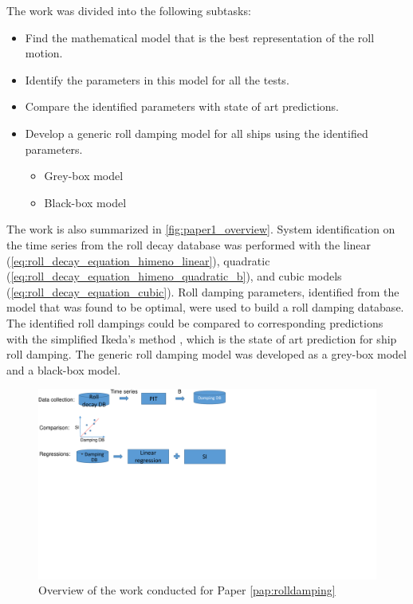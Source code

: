 \noindent The work was divided into the following subtasks: 
\begin{itemize}
    \item Find the mathematical model that is the best representation of the roll motion.
    \item Identify the parameters in this model for all the tests.
    \item Compare the identified parameters with state of art predictions.
    \item Develop a generic roll damping model for all ships using the identified parameters.
    \begin{itemize}
        \item Grey-box model
        \item Black-box model
    \end{itemize}
\end{itemize}

\noindent The work is also summarized in \autoref{fig:paper1_overview}. System identification on the time series from the roll decay database was performed with the linear (\autoref{eq:roll_decay_equation_himeno_linear}), quadratic (\autoref{eq:roll_decay_equation_himeno_quadratic_b}), and cubic models (\autoref{eq:roll_decay_equation_cubic}). Roll damping parameters, identified from the model that was found to be optimal, were used to build a roll damping database. The identified roll dampings could be compared to corresponding predictions with the simplified Ikeda's method \cite{kawahara_simple_2011}, which is the state of art prediction for ship roll damping.
The generic roll damping model was developed as a grey-box model and a black-box model.
\begin{figure}[!htb]
    \centering
    \includegraphics[width=\linewidth]{kappa/images/workflow.pdf}
    \caption{Overview of the work conducted for Paper \ref{pap:rolldamping}}
    \label{fig:paper1_overview}
\end{figure}

